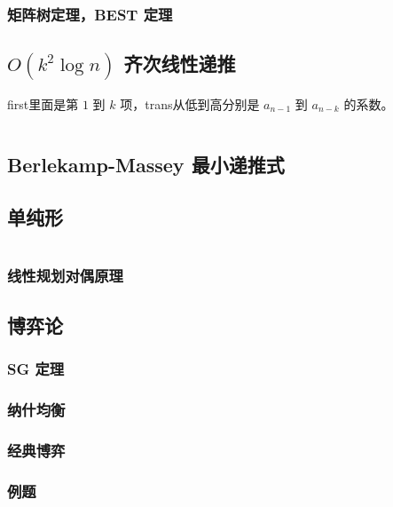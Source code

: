 \documentclass[a4paper, twoside]{article}
\begin{document}
\begin{multicols}{2}
				\subsubsection{矩阵树定理，BEST 定理}
					
			
			\subsection{$O(k^2 \log n)$ 齐次线性递推}
				first里面是第 $1$ 到 $k$ 项，trans从低到高分别是 $a_{n - 1}$ 到 $a_{n - k}$ 的系数。
				
				\inputminted{cpp}{../src/math/齐次线性递推.cpp}
			
			\subsection{Berlekamp-Massey 最小递推式}
				

			\subsection{单纯形}
				\inputminted{cpp}{../src/math/单纯形.cpp}

				\subsubsection{线性规划对偶原理}
					
			
			\subsection{博弈论}
				\subsubsection{SG 定理}
					

				\subsubsection{纳什均衡}
					

				\subsubsection{经典博弈}
					\label{classicgame}
					

				\subsubsection{例题}
					


\end{multicols}
\end{document}
